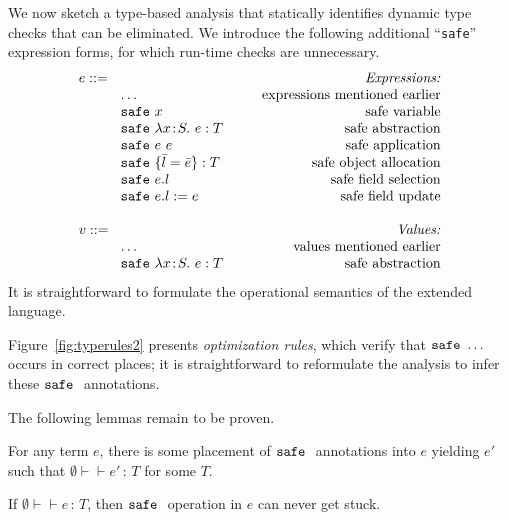\documentclass{article}
\newcommand{\lam}[4]{\lambda#1\!:\!#2.\,\,#4:#3}
\newcommand{\app}[2]{#1~#2}
\renewcommand{\t}[1]{{\tt #1}}
\newcommand{\judges}[3]{#1\vdash\!\!\!\vdash #2\,:\,#3}
\newcommand{\obje}[2]{\{#1\}:{#2}}
\newcommand{\objget}[2]{#1.#2}
\newcommand{\objset}[3]{#1.#2:=#3}
\newcommand{\safe}[1]{\t{safe}~#1}
\begin{document}
We now sketch a 
type-based analysis that statically identifies dynamic type checks that can be eliminated.
We introduce the following additional ``\t{safe}'' expression forms, for which run-time checks are unnecessary.
\[
\begin{array}{llr}
	\mydefhead{e ::=\qquad\qquad\qquad\qquad\qquad}{Expressions:} 
	\mydefcase{\dots								}{expressions mentioned earlier} 
	\mydefcase{\safe x								}{safe variable} 
	\mydefcase{\safe{\lam{x}{S}{T}{e}} 				}{safe abstraction} 
	\mydefcase{\safe{\app{e}{e}} 					}{safe application} 
	\mydefcase{\safe{} \obje{\bar{l}=\bar{e}}{T}		}{safe object allocation}
	\mydefcase{\safe{}\objget{e}{l}					}{safe field selection}
	\mydefcase{\safe{}\objset{e}{l}{e}				}{safe field update}
	\\
	\mydefhead{v ::=\qquad\qquad\qquad\qquad\qquad}{Values:} 
	\mydefcase{\dots								}{values mentioned earlier} 
	\mydefcase{\safe{\lam{x}{S}{T}{e}} 				}{safe abstraction} 
\end{array}
\]
It is straightforward to formulate the operational semantics of the extended language.

Figure~\ref{fig:typerules2} presents \emph{optimization rules}, which verify that $\safe \dots$ occurs in correct places;
it is straightforward to reformulate the analysis to infer these $\safe{}$ annotations.

The following lemmas remain to be proven.

\begin{lemma}[No Failure]
For any term $e$, there is some placement of $\safe{}$ annotations into $e$ yielding $e'$ such that
$\judges{\emptyset}{e'}{T}$ for some $T$.
\end{lemma}

\begin{lemma}[Soundness]
If $\judges{\emptyset}{e}{T}$, then $\safe{}$ operation in $e$ can never get stuck.
\end{lemma}


\newcommand{\maybesafe}[1]{\t{safe}^?~#1}
\end{document}
